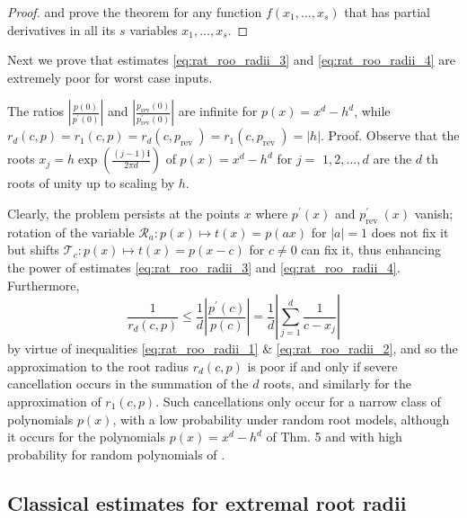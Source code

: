 \documentclass[runningheads]{llncs}
\begin{document}
\begin{proof}
\cite{Linnainmaa1976} and \cite{baur1983complexity} prove the theorem for any function $f\left(x_{1}, \ldots, x_{s}\right)$ that has partial derivatives in all its $s$ variables $x_{1}, \ldots, x_{s}$.
\end{proof}

Next we prove that estimates \ref{eq:rat_roo_radii_3} and \ref{eq:rat_roo_radii_4} are extremely poor for worst case inputs.

\begin{theorem}
The ratios $\left|\frac{p(0)}{p^{\prime}(0)}\right|$ and $\left|\frac{p_{\mathrm{rev}}(0)}{p_{\mathrm{rev}}^{\prime}(0)}\right|$ are infinite for $p(x)=x^{d}-h^{d}$, while $r_{d}(c, p)=r_{1}(c, p)=r_{d}\left(c, p_{\text {rev }}\right)=r_{1}\left(c, p_{\text {rev }}\right)=|h|$.
Proof. Observe that the roots $x_{j}=h \exp \left(\frac{(j-1) \mathbf{i}}{2 \pi d}\right)$ of $p(x)=x^{d}-h^{d}$ for $j=$ $1,2, \ldots, d$ are the $d$ th roots of unity up to scaling by $h$.
\end{theorem}

 Clearly, the problem persists at the points $x$ where $p^{\prime}(x)$ and $p_{\text {rev }}^{\prime}(x)$ vanish; rotation of the variable $\mathcal{R}_a :p(x) \mapsto t(x)=p(a x)$ for $|a|=1$ does not fix it but shifts $\mathcal{T}_c : p(x) \mapsto t(x)=p(x-c)$ for $c \neq 0$ can fix it, thus enhancing the power of estimates \ref{eq:rat_roo_radii_3} and \ref{eq:rat_roo_radii_4}.
Furthermore,
$$
\frac{1}{r_{d}(c, p)} \leq \frac{1}{d}\left|\frac{p^{\prime}(c)}{p(c)}\right|=\frac{1}{d}\left|\sum_{j=1}^{d} \frac{1}{c-x_{j}}\right|
$$
by virtue of inequalities \ref{eq:rat_roo_radii_1} \& \ref{eq:rat_roo_radii_2}, and so the approximation to the root radius $r_{d}(c, p)$ is poor if and only if severe cancellation occurs in the summation of the $d$ roots, and similarly for the approximation of $r_{1}(c, p)$. Such cancellations only occur for a narrow class of polynomials $p(x)$, with a low probability under random root models, although it occurs for the polynomials $p(x)=x^{d}-h^{d}$ of Thm. 5 and with high probability for random polynomials of \cite{erdos1950distribution}.

\subsection{Classical estimates for extremal root radii}\label{subsec:class_est}
\end{document}
